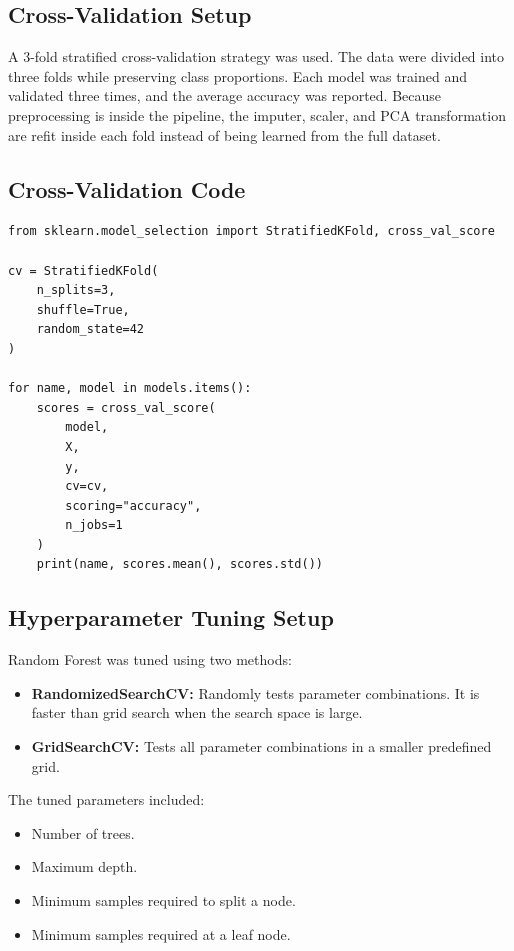 \documentclass[12pt,a4paper]{article}
\begin{document}
\subsection{Cross-Validation Setup}

A 3-fold stratified cross-validation strategy was used. The data were divided into three folds while preserving class proportions. Each model was trained and validated three times, and the average accuracy was reported. Because preprocessing is inside the pipeline, the imputer, scaler, and PCA transformation are refit inside each fold instead of being learned from the full dataset.

\subsection{Cross-Validation Code}

\begin{lstlisting}
from sklearn.model_selection import StratifiedKFold, cross_val_score

cv = StratifiedKFold(
    n_splits=3,
    shuffle=True,
    random_state=42
)

for name, model in models.items():
    scores = cross_val_score(
        model,
        X,
        y,
        cv=cv,
        scoring="accuracy",
        n_jobs=1
    )
    print(name, scores.mean(), scores.std())
\end{lstlisting}

\subsection{Hyperparameter Tuning Setup}

Random Forest was tuned using two methods:

\begin{itemize}
    \item \textbf{RandomizedSearchCV:} Randomly tests parameter combinations. It is faster than grid search when the search space is large.
    \item \textbf{GridSearchCV:} Tests all parameter combinations in a smaller predefined grid.
\end{itemize}

The tuned parameters included:

\begin{itemize}
    \item Number of trees.
    \item Maximum depth.
    \item Minimum samples required to split a node.
    \item Minimum samples required at a leaf node.
\end{itemize}
\end{document}
